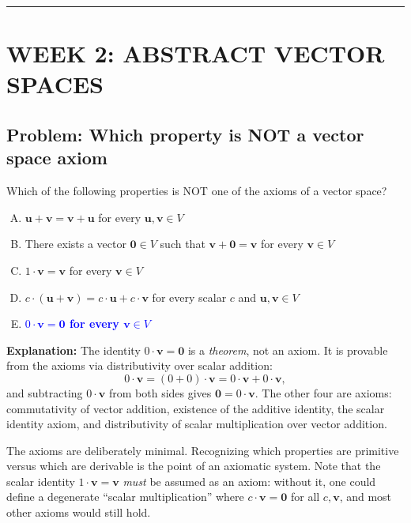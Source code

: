 \documentclass[12pt]{amsart}
\newcommand{\divider}{
  \vspace{-1em}
  \noindent
  \raisebox{-0.15ex}{\textbullet}%
  \hspace{0.5em}%
  \rule[0.5ex]{0.95\textwidth}{1.0pt}%
  \hspace{0.5em}%
  \raisebox{-0.15ex}{\textbullet}%
  \vspace{0em}
}
\begin{document}
\divider

\section*{WEEK 2: ABSTRACT VECTOR SPACES}

\subsection*{Problem: Which property is NOT a vector space axiom}

Which of the following properties is NOT one of the axioms of a vector space?

\begin{enumerate}[(A)]
\item $\mathbf{u} + \mathbf{v} = \mathbf{v} + \mathbf{u}$ for every $\mathbf{u}, \mathbf{v} \in V$
\item There exists a vector $\mathbf{0} \in V$ such that $\mathbf{v} + \mathbf{0} = \mathbf{v}$ for every $\mathbf{v} \in V$
\item $1 \cdot \mathbf{v} = \mathbf{v}$ for every $\mathbf{v} \in V$
\item $c \cdot (\mathbf{u} + \mathbf{v}) = c \cdot \mathbf{u} + c \cdot \mathbf{v}$ for every scalar $c$ and $\mathbf{u}, \mathbf{v} \in V$
\item \textcolor{blue}{\textbf{$0 \cdot \mathbf{v} = \mathbf{0}$ for every $\mathbf{v} \in V$}}
\end{enumerate}

\textbf{Explanation:}
The identity $0 \cdot \mathbf{v} = \mathbf{0}$ is a \emph{theorem}, not an
axiom. It is provable from the axioms via distributivity over scalar addition:
$$0 \cdot \mathbf{v} = (0 + 0) \cdot \mathbf{v} = 0 \cdot \mathbf{v} + 0 \cdot \mathbf{v},$$
and subtracting $0 \cdot \mathbf{v}$ from both sides gives $\mathbf{0} = 0 \cdot \mathbf{v}$.
The other four are axioms: commutativity of vector addition, existence of the
additive identity, the scalar identity axiom, and distributivity of scalar
multiplication over vector addition.

The axioms are deliberately minimal. Recognizing which properties are
primitive versus which are derivable is the point of an axiomatic system.
Note that the scalar identity $1 \cdot \mathbf{v} = \mathbf{v}$ \emph{must} be
assumed as an axiom: without it, one could define a degenerate ``scalar
multiplication'' where $c \cdot \mathbf{v} = \mathbf{0}$ for all
$c, \mathbf{v}$, and most other axioms would still hold.
\end{document}
